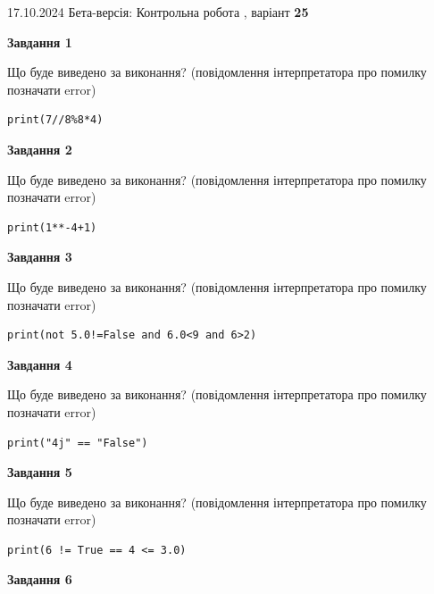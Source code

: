 \documentclass[12pt, ukrainian]{article}
\begin{document}
{\Large{17.10.2024 Бета-версія: Контрольна робота , варіант  \No \textbf { 25 }\par}}
{
\begin {large}
{\begin {center}\textbf{Завдання 1}\end {center}}

Що буде виведено за виконання? (повідомлення інтерпретатора про помилку позначати error)\par
\begin{verbatim}
print(7//8%8*4)
\end{verbatim}

{\begin {center}\textbf{Завдання 2}\end {center}}

Що буде виведено за виконання? (повідомлення інтерпретатора про помилку позначати error)\par
\begin{verbatim}
print(1**-4+1)
\end{verbatim}

{\begin {center}\textbf{Завдання 3}\end {center}}

Що буде виведено за виконання? (повідомлення інтерпретатора про помилку позначати error)\par
\begin{verbatim}
print(not 5.0!=False and 6.0<9 and 6>2)
\end{verbatim}

{\begin {center}\textbf{Завдання 4}\end {center}}

Що буде виведено за виконання? (повідомлення інтерпретатора про помилку позначати error)\par
\begin{verbatim}
print("4j" == "False")
\end{verbatim}

{\begin {center}\textbf{Завдання 5}\end {center}}

Що буде виведено за виконання? (повідомлення інтерпретатора про помилку позначати error)\par
\begin{verbatim}
print(6 != True == 4 <= 3.0)
\end{verbatim}

{\begin {center}\textbf{Завдання 6}\end {center}}


\end{large}}
\end{document}
